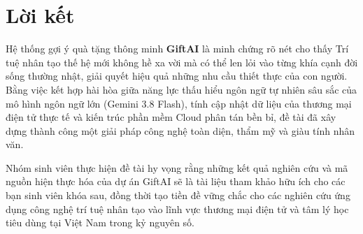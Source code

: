 \section{Lời kết}

Hệ thống gợi ý quà tặng thông minh \textbf{GiftAI} là minh chứng rõ nét cho thấy Trí tuệ nhân tạo thế hệ mới không hề xa vời mà có thể len lỏi vào từng khía cạnh đời sống thường nhật, giải quyết hiệu quả những nhu cầu thiết thực của con người. Bằng việc kết hợp hài hòa giữa năng lực thấu hiểu ngôn ngữ tự nhiên sâu sắc của mô hình ngôn ngữ lớn (Gemini 3.8 Flash), tính cập nhật dữ liệu của thương mại điện tử thực tế và kiến trúc phần mềm Cloud phân tán bền bỉ, đề tài đã xây dựng thành công một giải pháp công nghệ toàn diện, thẩm mỹ và giàu tính nhân văn.

Nhóm sinh viên thực hiện đề tài hy vọng rằng những kết quả nghiên cứu và mã nguồn hiện thực hóa của dự án GiftAI sẽ là tài liệu tham khảo hữu ích cho các bạn sinh viên khóa sau, đồng thời tạo tiền đề vững chắc cho các nghiên cứu ứng dụng công nghệ trí tuệ nhân tạo vào lĩnh vực thương mại điện tử và tâm lý học tiêu dùng tại Việt Nam trong kỷ nguyên số.